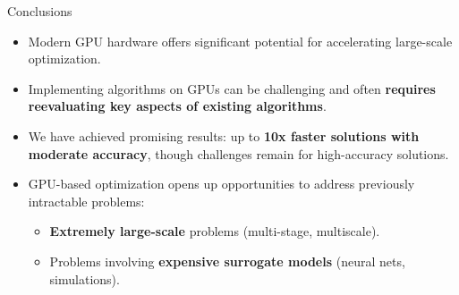 \begin{frame}{Conclusions}
\begin{itemize}
  \item Modern GPU hardware offers significant potential for accelerating large-scale optimization.
  \item Implementing algorithms on GPUs can be challenging and often {\bf requires reevaluating key aspects of existing algorithms}.
  \item We have achieved promising results: up to \textbf{10x faster solutions with moderate accuracy}, though challenges remain for high-accuracy solutions.
  \item GPU-based optimization opens up opportunities to address previously intractable problems:
    \begin{itemize}
    \item {\bf Extremely large-scale} problems (multi-stage, multiscale).
    \item Problems involving {\bf expensive surrogate models} (neural nets, simulations).
    \end{itemize}
  \end{itemize}
\end{frame}

